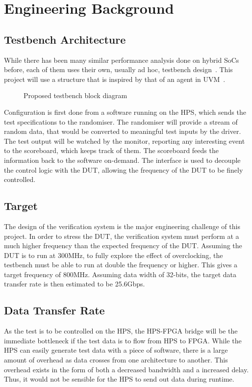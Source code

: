 \section{Engineering Background}

\subsection{Testbench Architecture}

While there has been many similar performance analysis done on hybrid SoCs
before, each of them uses their own, usually ad hoc, testbench
design~\cite{Shi1}.
This project will use a structure that is inspired by that of an agent in
UVM~\cite{Accellera1}.

\begin{figure}[H]
  \centering
  
  \caption{Proposed testbench block diagram}
  \label{Block}
\end{figure}

Configuration is first done from a software running on the HPS, which sends
the test specifications to the randomiser.
The randomiser will provide a stream of random data, that would be converted
to meaningful test inputs by the driver.
The test output will be watched by the monitor, reporting any interesting
event to the scoreboard, which keeps track of them.
The scoreboard feeds the information back to the software on-demand.
The interface is used to decouple the control logic with the DUT, allowing
the frequency of the DUT to be finely controlled.

\subsection{Target}
The design of the verification system is the major engineering challenge of this
project.
In order to stress the DUT, the verification system must perform at a much
higher frequency than the expected frequency of the DUT.
Assuming the DUT is to run at 300MHz, to fully explore the effect of
overclocking, the testbench must be able to run at double the frequency or
higher.
This gives a target frequency of 800MHz.
Assuming data width of 32-bits, the target data transfer rate is then 
estimated to be 25.6Gbps.

\subsection{Data Transfer Rate}
As the test is to be controlled on the HPS, the HPS-FPGA bridge will be the
immediate bottleneck if the test data is to flow from HPS to FPGA.
While the HPS can easily generate test data with a piece of software,
there is a large amount of overhead as data crosses from one architecture
to another.
This overhead exists in the form of both a decreased bandwidth and a increased
delay.
Thus, it would not be sensible for the HPS to send out data during runtime.

